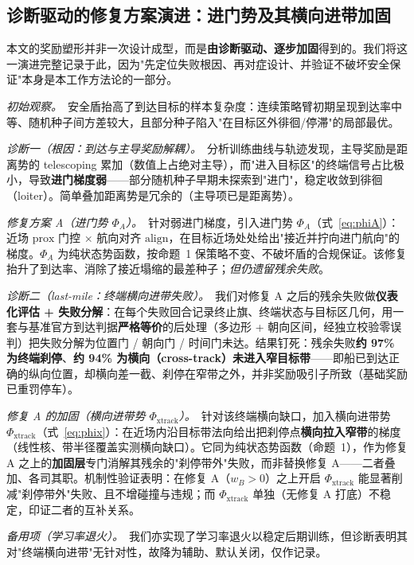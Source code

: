 \documentclass[12pt,letterpaper]{article}
\begin{document}
\subsection{诊断驱动的修复方案演进：进门势及其横向进带加固}
本文的奖励塑形并非一次设计成型，而是\textbf{由诊断驱动、逐步加固}得到的。我们将这一演进完整记录于此，因为"先定位失败根因、再对症设计、并验证不破坏安全保证"本身是本工作方法论的一部分。

\textit{初始观察。}\ 安全盾抬高了到达目标的样本复杂度：连续策略臂初期呈现到达率中等、随机种子间方差较大，且部分种子陷入"在目标区外徘徊/停滞"的局部最优。

\textit{诊断一（根因：到达与主导奖励解耦）。}\ 分析训练曲线与轨迹发现，主导奖励是距离势的 telescoping 累加（数值上占绝对主导），而"进入目标区"的终端信号占比极小，导致\textbf{进门梯度弱}——部分随机种子早期未探索到"进门"，稳定收敛到徘徊（loiter）。简单叠加距离势是冗余的（主导项已是距离势）。

\textit{修复方案 A（进门势 $\Phi_A$）。}\ 针对弱进门梯度，引入进门势 $\Phi_A$（式~\eqref{eq:phiA}）：近场 $\mathrm{prox}$ 门控 $\times$ 航向对齐 $\mathrm{align}$，在目标近场处处给出"接近并拧向进门航向"的梯度。$\Phi_A$ 为纯状态势函数，按命题~1 保策略不变、不破坏盾的合规保证。该修复抬升了到达率、消除了接近塌缩的最差种子；\textit{但仍遗留残余失败}。

\textit{诊断二（last-mile：终端横向进带失败）。}\ 我们对修复 A 之后的残余失败做\textbf{仪表化评估 + 失败分解}：在每个失败回合记录终止旗、终端状态与目标区几何，用一套与基准官方到达判据\textbf{严格等价}的后处理（多边形 + 朝向区间，经独立校验零误判）把失败分解为位置门 / 朝向门 / 时间门未达。结果钉死：残余失败\textbf{约 97\% 为终端刹停}、\textbf{约 94\% 为横向（cross-track）未进入窄目标带}——即船已到达正确的纵向位置，却横向差一截、刹停在窄带之外，并非奖励吸引子所致（基础奖励已重罚停车）。

\textit{修复 A 的加固（横向进带势 $\Phi_{\text{xtrack}}$）。}\ 针对该终端横向缺口，加入横向进带势 $\Phi_{\text{xtrack}}$（式~\eqref{eq:phix}）：在近场内沿目标带法向给出把刹停点\textbf{横向拉入窄带}的梯度（线性核、带半径覆盖实测横向缺口）。它同为纯状态势函数（命题~1），作为修复 A 之上的\textbf{加固层}专门消解其残余的"刹停带外"失败，而非替换修复 A——二者叠加、各司其职。机制性验证表明：在修复 A（$w_B>0$）之上开启 $\Phi_{\text{xtrack}}$ 能显著削减"刹停带外"失败、且不增碰撞与违规；而 $\Phi_{\text{xtrack}}$ 单独（无修复 A 打底）不稳定，印证二者的互补关系。

\textit{备用项（学习率退火）。}\ 我们亦实现了学习率退火以稳定后期训练，但诊断表明其对"终端横向进带"无针对性，故降为辅助、默认关闭，仅作记录。
\end{document}
